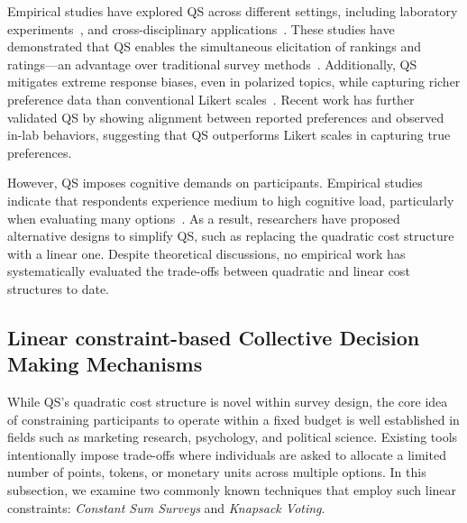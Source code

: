 Empirical studies have explored QS across different settings, including laboratory experiments~\cite{chengCanShowWhat2021,quarfoot2017quadratic}, and cross-disciplinary applications~\cite{cavaille2024cares, hollandDistributiveImpactsSupport2022,naylor2017first}. These studies have demonstrated that QS enables the simultaneous elicitation of rankings and ratings---an advantage over traditional survey methods~\cite{chengCanShowWhat2021}. Additionally, QS mitigates extreme response biases, even in polarized topics, while capturing richer preference data than conventional Likert scales~\cite{quarfoot2017quadratic, cavaille2024cares, chengCanShowWhat2021, naylor2017first}. Recent work has further validated QS by showing alignment between reported preferences and observed in-lab behaviors, suggesting that QS outperforms Likert scales in capturing true preferences.

However, QS imposes cognitive demands on participants. Empirical studies indicate that respondents experience medium to high cognitive load, particularly when evaluating many options~\cite{cavaille2024cares, chengOrganizeThenVote2025}. As a result, researchers have proposed alternative designs to simplify QS, such as replacing the quadratic cost structure with a linear one. Despite theoretical discussions, no empirical work has systematically evaluated the trade-offs between quadratic and linear cost structures to date.

\subsection{Linear constraint-based Collective Decision Making Mechanisms}
\label{sec:related_works_force_choice}
While QS’s quadratic cost structure is novel within survey design, the core idea of constraining participants to operate within a fixed budget is well established in fields such as marketing research, psychology, and political science. Existing tools intentionally impose trade-offs where individuals are asked to allocate a limited number of points, tokens, or monetary units across multiple options. In this subsection, we examine two commonly known techniques that employ such linear constraints: \textit{Constant Sum Surveys} and \textit{Knapsack Voting}.

